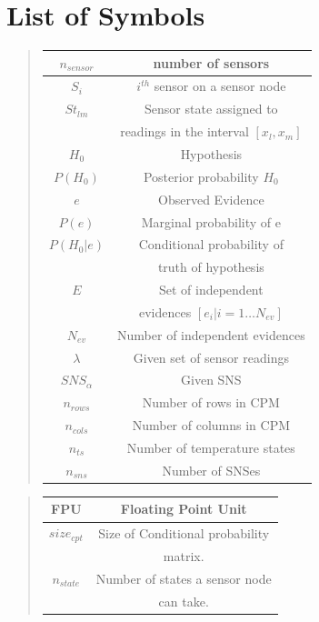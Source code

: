 \documentclass{sig-alternate-10pt}
\begin{document}
\section{List of Symbols}

\begin{quote}
\begin{tabular}{|c|c|}
\hline
$n_{sensor}$ & number of sensors \\
\hline 
$S_i$ & $i^{th}$ sensor on a sensor node \\
\hline 
$St_{lm}$ & Sensor state assigned to \\
 & readings in the interval $[x_l,x_m]$ \\
 \hline 
$H_0$ & Hypothesis \\
\hline 
$P(H_0)$ & Posterior probability $H_0$ \\
\hline 
$e$ & Observed Evidence \\
\hline 
$P(e)$ & Marginal probability of e \\
\hline 
$P(H_0|e)$ & Conditional probability of \\ 
 &  truth of hypothesis \\
\hline
$E$ & Set of independent \\
 & evidences $[e_i|i=1 \ldots N_{ev}]$ \\
 \hline 
$N_{ev}$ & Number of independent evidences \\
\hline 
$\lambda$ & Given set of sensor readings \\
\hline 
$SNS_{\alpha}$ & Given SNS \\
\hline 
$n_{rows}$ & Number of rows in CPM \\
\hline 
$n_{cols}$ & Number of columns in CPM \\
\hline 
$n_{ts}$ & Number of temperature states \\
\hline 
$n_{sns}$ & Number of SNSes \\
\hline  
 \end{tabular}
\end{quote}
\balancecolumns
\begin{quote}
\begin{tabular}{|c|c|} 
 \hline
FPU & Floating Point Unit \\
\hline 
$size_{cpt}$ & Size of Conditional probability\\
\hline 
 & matrix.\\
 \hline 
$n_{state}$ & Number of states a sensor node \\
 & can take.\\
\hline
\end{tabular}
\end{quote}
\end{document}
